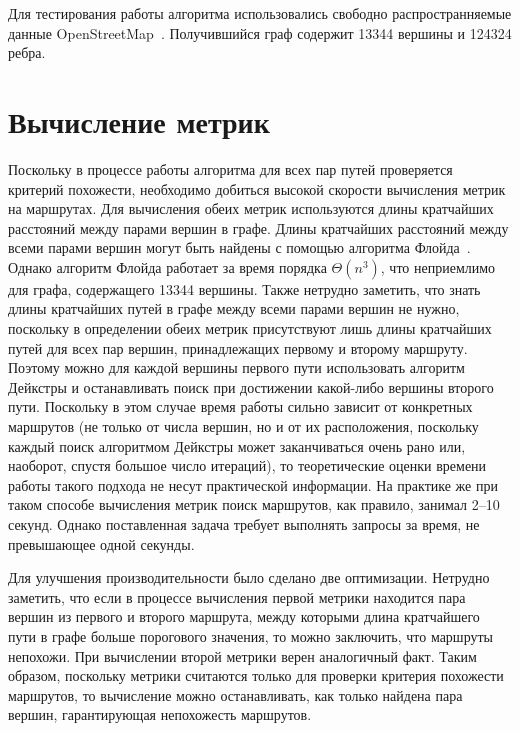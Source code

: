 Для тестирования работы алгоритма использовались свободно
распространняемые данные OpenStreetMap~\cite{osm}. Получившийся граф
содержит 13344 вершины и 124324 ребра.

\FloatBarrier

\section{Вычисление метрик}

\label{sec:metrics-computation}

Поскольку в процессе работы алгоритма для всех пар путей проверяется
критерий похожести, необходимо добиться высокой скорости вычисления
метрик на маршрутах. Для вычисления обеих метрик используются длины
кратчайших расстояний между парами вершин в графе. Длины кратчайших
расстояний между всеми парами вершин могут быть найдены с помощью
алгоритма Флойда~\cite{floyd1962algorithm}. Однако алгоритм Флойда
работает за время порядка $\Theta(n^3)$, что неприемлимо для графа,
содержащего 13344 вершины. Также нетрудно заметить, что знать длины
кратчайших путей в графе между всеми парами вершин не нужно, поскольку
в определении обеих метрик присутствуют лишь длины кратчайших путей
для всех пар вершин, принадлежащих первому и второму маршруту. Поэтому
можно для каждой вершины первого пути использовать алгоритм Дейкстры и
останавливать поиск при достижении какой-либо вершины второго пути.
Поскольку в этом случае время работы сильно зависит от конкретных
маршрутов (не только от числа вершин, но и от их расположения,
поскольку каждый поиск алгоритмом Дейкстры может заканчиваться очень
рано или, наоборот, спустя большое число итераций), то теоретические
оценки времени работы такого подхода не несут практической информации.
На практике же при таком способе вычисления метрик поиск маршрутов,
как правило, занимал 2--10 секунд. Однако поставленная задача требует
выполнять запросы за время, не превышающее одной секунды.

Для улучшения производительности было сделано две оптимизации.
Нетрудно заметить, что если в процессе вычисления первой метрики
находится пара вершин из первого и второго маршрута, между которыми
длина кратчайшего пути в графе больше порогового значения, то можно
заключить, что маршруты непохожи. При вычислении второй метрики верен
аналогичный факт. Таким образом, поскольку метрики считаются только
для проверки критерия похожести маршрутов, то вычисление можно
останавливать, как только найдена пара вершин, гарантирующая
непохожесть маршрутов.

